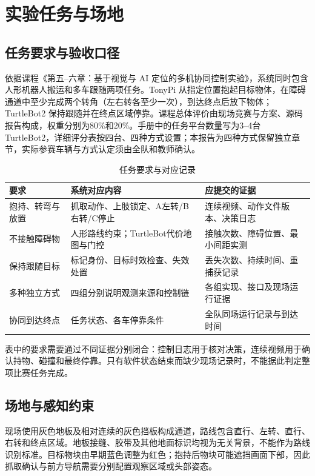 \section{实验任务与场地}
\subsection{任务要求与验收口径}
依据课程《第五--六章：基于视觉与 AI 定位的多机协同控制实验》\cite{course}，系统同时包含人形机器人搬运和多车跟随两项任务。TonyPi 从指定位置抱起目标物体，在障碍通道中至少完成两个转角（左右转各至少一次），到达终点后放下物体；TurtleBot2 保持跟随并在终点区域停靠。课程总体评价由现场竞赛与方案、源码报告构成，权重分别为80\%和20\%。手册中的任务平台数量写为3--4台 TurtleBot2，详细评分表按四台、四种方式设置；本报告为四种方式保留独立章节，实际参赛车辆与方式认定须由全队和教师确认。

\begin{table}[H]\centering\small
\caption{任务要求与对应记录}
\begin{tabularx}{\linewidth}{p{30mm}YY}\toprule
要求 & 系统对应内容 & 应提交的证据\\\midrule
抱持、转弯与放置 & 抓取动作、上肢锁定、A左转/B右转/C停止 & 连续视频、动作文件版本、决策日志\\
不接触障碍物 & 人形路线约束；TurtleBot代价地图与门控 & 接触次数、障碍位置、最小间距实测\\
保持跟随目标 & 标记身份、目标时效检查、失效处置 & 丢失次数、持续时间、重捕获记录\\
多种独立方式 & 四组分别说明观测来源和控制链 & 各组实现、接口及现场运行证据\\
协同到达终点 & 任务状态、各车停靠条件 & 全队同场运行记录与到达时间\\\bottomrule
\end{tabularx}\end{table}

表中的要求需要通过不同证据分别闭合：控制日志用于核对决策，连续视频用于确认持物、碰撞和最终停靠。只有软件状态结束而缺少现场记录时，不能据此判定整项比赛任务完成。


\subsection{场地与感知约束}
现场使用灰色地板及相对连续的灰色挡板构成通道，路线包含直行、左转、直行、右转和终点区域。地板接缝、胶带及其他地面标识均视为无关背景，不能作为路线识别标准。目标物块由早期蓝色调整为红色；抱持后物块可能遮挡画面下部，因此抓取确认与前方导航需要分别配置观察区域或头部姿态。

